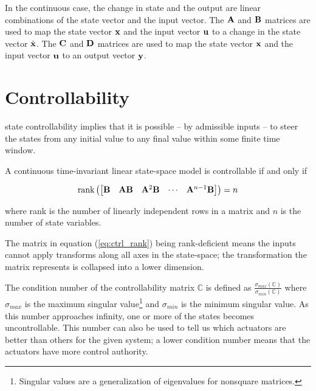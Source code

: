 In the continuous case, the change in \gls{state} and the \gls{output} are
linear combinations of the \gls{state} vector and the \gls{input} vector. The
$\mathbf{A}$ and $\mathbf{B}$ matrices are used to map the \gls{state} vector
$\mathbf{x}$ and the \gls{input} vector $\mathbf{u}$ to a change in the \gls{state}
vector $\dot{\mathbf{x}}$. The $\mathbf{C}$ and $\mathbf{D}$ matrices are used to map the
\gls{state} vector $\mathbf{x}$ and the \gls{input} vector $\mathbf{u}$ to an
\gls{output} vector $\mathbf{y}$.

\section{Controllability}

\Gls{state} controllability implies that it is possible -- by admissible inputs
-- to steer the \glspl{state} from any initial value to any final value within
some finite time window.

\begin{theorem}[Controllability]
  A continuous \gls{time-invariant} linear state-space \gls{model} is
  controllable if and only if

  \begin{equation}
    \text{rank} \left(
    \begin{bmatrix}
      \mathbf{B} & \mathbf{A}\mathbf{B} & \mathbf{A}^2\mathbf{B} & \cdots &
      \mathbf{A}^{n-1}\mathbf{B}
    \end{bmatrix}
    \right) = n
    \label{eq:ctrl_rank}
  \end{equation}

  where rank is the number of linearly independent rows in a matrix and $n$ is
  the number of \gls{state} variables.
\end{theorem}

The matrix in equation (\ref{eq:ctrl_rank}) being rank-deficient means the
\glspl{input} cannot apply transforms along all axes in the state-space; the
transformation the matrix represents is collapsed into a lower dimension.

The condition number of the controllability matrix $\mathbb{C}$ is defined as
$\frac{\sigma_{max}(\mathbb{C})}{\sigma_{min}(\mathbb{C})}$ where $\sigma_{max}$
is the maximum singular value\footnote{\label{footn:singular_val}Singular values
are a generalization of eigenvalues for nonsquare matrices.} and $\sigma_{min}$
is the minimum singular value. As this number approaches infinity, one or more
of the \glspl{state} becomes uncontrollable. This number can also be used to
tell us which actuators are better than others for the given \gls{system}; a
lower condition number means that the actuators have more control authority.

